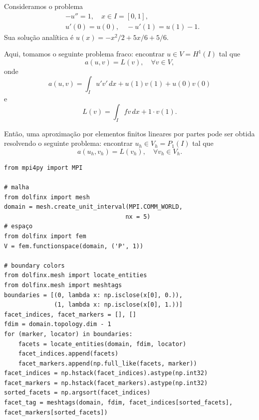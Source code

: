 \begin{ex}\label{ex:cc_r}
  Consideramos o problema
  \begin{align}
    &-u'' = 1,\quad x\in I=[0,1],\label{eq:ex_cc_r_eq}\\
    &u'(0) = u(0),\quad -u'(1) = u(1) - 1.\label{eq:ex_cc_r_bc}
  \end{align}
Sua solução analítica é $u(x) = -x^2/2+5x/6+5/6$. 

Aqui, tomamos o seguinte problema fraco: encontrar $u\in V=H^1(I)$ tal que
\begin{equation}
  a(u, v) = L(v),\quad\forall v\in V,
\end{equation}
onde
\begin{equation}
  a(u, v) = \int_I u'v'\,dx + u(1)v(1) + u(0)v(0)
\end{equation}
e
\begin{equation}
  L(v) = \int_I fv\,dx + 1\cdot v(1).
\end{equation}

Então, uma aproximação por elementos finitos lineares por partes pode ser obtida resolvendo o seguinte problema: encontrar $u_h\in V_h=P_1(I)$ tal que
\begin{equation}
  a(u_h, v_h) = L(v_h),\quad\forall v_h\in V_h.
\end{equation}



\begin{lstlisting}
from mpi4py import MPI

# malha
from dolfinx import mesh
domain = mesh.create_unit_interval(MPI.COMM_WORLD,
                                  nx = 5)
# espaço
from dolfinx import fem
V = fem.functionspace(domain, ('P', 1))

# boundary colors
from dolfinx.mesh import locate_entities
from dolfinx.mesh import meshtags
boundaries = [(0, lambda x: np.isclose(x[0], 0.)),
              (1, lambda x: np.isclose(x[0], 1.))]
facet_indices, facet_markers = [], []
fdim = domain.topology.dim - 1
for (marker, locator) in boundaries:
    facets = locate_entities(domain, fdim, locator)
    facet_indices.append(facets)
    facet_markers.append(np.full_like(facets, marker))
facet_indices = np.hstack(facet_indices).astype(np.int32)
facet_markers = np.hstack(facet_markers).astype(np.int32)
sorted_facets = np.argsort(facet_indices)
facet_tag = meshtags(domain, fdim, facet_indices[sorted_facets], facet_markers[sorted_facets])


\end{lstlisting}
\end{ex}
